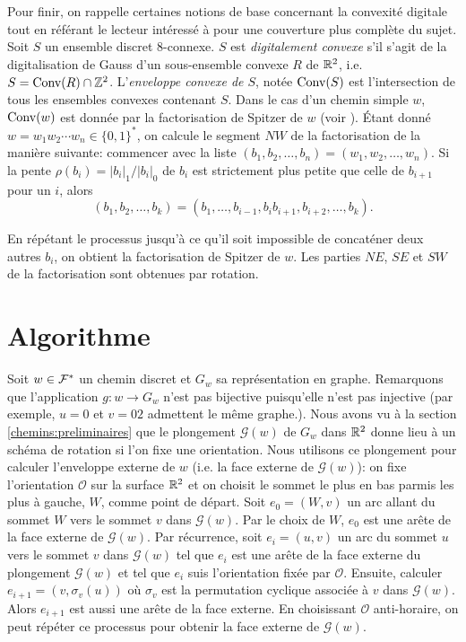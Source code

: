 Pour finir, on rappelle certaines notions de base concernant la convexité digitale tout en référant le lecteur intéressé à \cite{blpr09,thesexavier} pour une couverture plus complète du sujet. Soit $S$ un ensemble discret $8$-connexe. $S$ est \emph{digitalement convexe} s'il s'agit de la digitalisation de Gauss d'un sous-ensemble convexe $R$ de $\mathbb{R}^2$, i.e. $S=\text{Conv}(R)\cap \mathbb{Z}^2$. L'\emph{enveloppe convexe de $S$}, notée $\text{Conv}(S)$ est l'intersection de tous les ensembles convexes contenant $S$. Dans le cas d'un chemin simple $w$, $\text{Conv}(w)$ est donnée par la factorisation de Spitzer de $w$ (voir \cite{spitzer56,blpr09}). Étant donné $w=w_1w_2\cdots w_n \in \{0,1\}^*$, on calcule le segment $NW$ de la factorisation de la manière suivante: commencer avec la liste $(b_1,b_2,\dots,b_n)=(w_1,w_2,\dots,w_n)$. Si la pente $\rho(b_i)=|b_i|_1/|b_i|_0$ de $b_i$ est strictement plus petite que celle de $b_{i+1}$ pour un $i$, alors
\[
(b_1,b_2,\dots,b_k)=(b_1,\dots,b_{i-1},b_i b_{i+1},b_{i+2},\dots,b_k)\text{.}
\]

En répétant le processus jusqu'à ce qu'il soit impossible de concaténer deux autres $b_i$, on obtient la factorisation de Spitzer de $w$. Les parties $NE$, $SE$ et $SW$ de la factorisation sont obtenues par rotation.

\section{Algorithme}

Soit $w\in\mathcal{F}^*$ un chemin discret et $G_w$ sa représentation en graphe. Remarquons que l'application $g:w\rightarrow G_w$ n'est pas bijective puisqu'elle n'est pas injective (par exemple, $u=0$ et $v=02$ admettent le même graphe.). Nous avons vu à la section \ref{chemins:preliminaires} que le plongement $\mathcal{G}(w)$ de $G_w$ dans $\mathbb{R}^2$ donne lieu à un schéma de rotation si l'on fixe une orientation. Nous utilisons ce plongement pour calculer l'enveloppe externe de $w$ (i.e. la face externe de $\mathcal{G}(w)$): on fixe l'orientation $\mathcal{O}$ sur la surface $\mathbb{R}^2$ et on choisit le sommet le plus en bas parmis les plus à gauche, $W$, comme point de départ. Soit $e_0=(W,v)$ un arc allant du sommet $W$ vers le sommet $v$ dans $\mathcal{G}(w)$. Par le choix de $W$, $e_0$ est une arête de la face externe de $\mathcal{G}(w)$. Par récurrence, soit $e_i=(u,v)$ un arc du sommet $u$ vers le sommet $v$ dans $\mathcal{G}(w)$ tel que $e_i$ est une arête de la face externe du plongement $\mathcal{G}(w)$ et tel que $e_i$ suis l'orientation fixée par $\mathcal{O}$. Ensuite, calculer $e_{i+1}=(v,\sigma_v(u))$ où $\sigma_v$ est la permutation cyclique associée à $v$ dans $\mathcal{G}(w)$. Alors $e_{i+1}$ est aussi une arête de la face externe. En choisissant $\mathcal{O}$ anti-horaire, on peut répéter ce processus pour obtenir la face externe de $\mathcal{G}(w)$.

